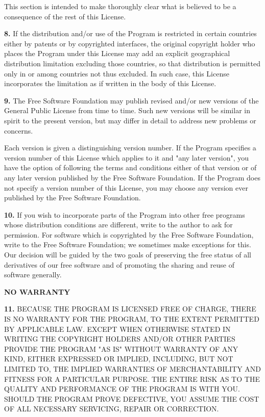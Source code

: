 This section is intended to make thoroughly clear what is believed to be a
consequence of the rest of this License.

{\bf 8.} If the distribution and/or use of the Program is restricted in
certain countries either by patents or by copyrighted interfaces, the original
copyright holder who places the Program under this License may add an explicit
geographical distribution limitation excluding those countries, so that
distribution is permitted only in or among countries not thus excluded. In
such case, this License incorporates the limitation as if written in the body
of this License.

{\bf 9.} The Free Software Foundation may publish revised and/or new versions
of the General Public License from time to time. Such new versions will be
similar in spirit to the present version, but may differ in detail to address
new problems or concerns.

Each version is given a distinguishing version number. If the Program
specifies a version number of this License which applies to it and "any later
version", you have the option of following the terms and conditions either of
that version or of any later version published by the Free Software
Foundation. If the Program does not specify a version number of this License,
you may choose any version ever published by the Free Software Foundation.

{\bf 10.} If you wish to incorporate parts of the Program into other free
programs whose distribution conditions are different, write to the author to
ask for permission. For software which is copyrighted by the Free Software
Foundation, write to the Free Software Foundation; we sometimes make
exceptions for this. Our decision will be guided by the two goals of
preserving the free status of all derivatives of our free software and of
promoting the sharing and reuse of software generally.

{\bf NO WARRANTY}

{\bf 11.} BECAUSE THE PROGRAM IS LICENSED FREE OF CHARGE, THERE IS NO WARRANTY
FOR THE PROGRAM, TO THE EXTENT PERMITTED BY APPLICABLE LAW. EXCEPT WHEN
OTHERWISE STATED IN WRITING THE COPYRIGHT HOLDERS AND/OR OTHER PARTIES PROVIDE
THE PROGRAM "AS IS" WITHOUT WARRANTY OF ANY KIND, EITHER EXPRESSED OR
IMPLIED, INCLUDING, BUT NOT LIMITED TO, THE IMPLIED WARRANTIES OF
MERCHANTABILITY AND FITNESS FOR A PARTICULAR PURPOSE. THE ENTIRE RISK AS TO
THE QUALITY AND PERFORMANCE OF THE PROGRAM IS WITH YOU. SHOULD THE PROGRAM
PROVE DEFECTIVE, YOU ASSUME THE COST OF ALL NECESSARY SERVICING, REPAIR OR
CORRECTION.

